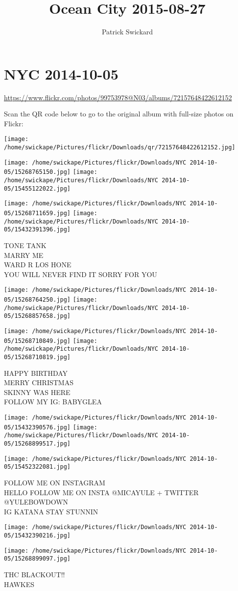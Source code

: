 \documentclass[10pt,letterpaper]{article}
\title{Ocean City 2015-08-27}
\author{Patrick Swickard}
\date{}
\begin{document}
\section*{NYC 2014-10-05}

\url{https://www.flickr.com/photos/99753978@N03/albums/72157648422612152}

Scan the QR code below to go to the original album with full-size photos on Flickr:

\texttt{[image: /home/swickape/Pictures/flickr/Downloads/qr/72157648422612152.jpg]}
\pagebreak

\texttt{[image: /home/swickape/Pictures/flickr/Downloads/NYC 2014-10-05/15268765150.jpg]}
\texttt{[image: /home/swickape/Pictures/flickr/Downloads/NYC 2014-10-05/15455122022.jpg]}

\texttt{[image: /home/swickape/Pictures/flickr/Downloads/NYC 2014-10-05/15268711659.jpg]}
\texttt{[image: /home/swickape/Pictures/flickr/Downloads/NYC 2014-10-05/15432391396.jpg]}

TONE TANK\\
MARRY ME\\
WARD R LOS HONE\\
YOU WILL NEVER FIND IT SORRY FOR YOU
\pagebreak

\texttt{[image: /home/swickape/Pictures/flickr/Downloads/NYC 2014-10-05/15268764250.jpg]}
\texttt{[image: /home/swickape/Pictures/flickr/Downloads/NYC 2014-10-05/15268857658.jpg]}

\texttt{[image: /home/swickape/Pictures/flickr/Downloads/NYC 2014-10-05/15268710849.jpg]}
\texttt{[image: /home/swickape/Pictures/flickr/Downloads/NYC 2014-10-05/15268710819.jpg]}

HAPPY BIRTHDAY\\
MERRY CHRISTMAS\\
SKINNY WAS HERE\\
FOLLOW MY IG: BABYGLEA
\pagebreak

\texttt{[image: /home/swickape/Pictures/flickr/Downloads/NYC 2014-10-05/15432390576.jpg]}
\texttt{[image: /home/swickape/Pictures/flickr/Downloads/NYC 2014-10-05/15268899517.jpg]}

\vspace{0.25in}
\texttt{[image: /home/swickape/Pictures/flickr/Downloads/NYC 2014-10-05/15452322081.jpg]}

FOLLOW ME ON INSTAGRAM\\
HELLO FOLLOW ME ON INSTA @MICAYULE + TWITTER @YULEBOWDOWN\\
IG KATANA STAY STUNNIN
\pagebreak

\texttt{[image: /home/swickape/Pictures/flickr/Downloads/NYC 2014-10-05/15432390216.jpg]}

\vspace{0.25in}
\texttt{[image: /home/swickape/Pictures/flickr/Downloads/NYC 2014-10-05/15268899097.jpg]}

THC BLACKOUT!!\\
HAWKES
\pagebreak
\end{document}
